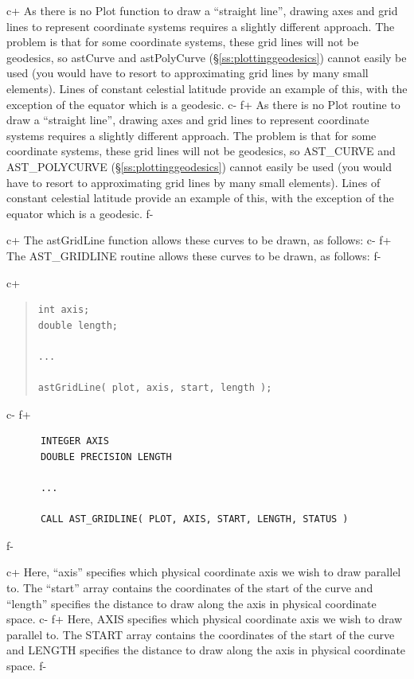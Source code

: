 \documentclass[twoside,11pt]{article}
\newcommand{\secref}[1]{\S\ref{#1}}
\newcommand{\secref}[1]{\ref{#1}}
\begin{document}
c+
As there is no Plot function to draw a ``straight line'', drawing axes
and grid lines to represent coordinate systems requires a slightly
different approach. The problem is that for some coordinate systems,
these grid lines will not be geodesics, so astCurve and astPolyCurve
(\secref{ss:plottinggeodesics}) cannot easily be used (you would have
to resort to approximating grid lines by many small elements). Lines
of constant celestial latitude provide an example of this, with the
exception of the equator which is a geodesic.
c-
f+
As there is no Plot routine to draw a ``straight line'', drawing axes
and grid lines to represent coordinate systems requires a slightly
different approach. The problem is that for some coordinate systems,
these grid lines will not be geodesics, so AST\_CURVE and
AST\_POLYCURVE (\secref{ss:plottinggeodesics}) cannot easily be used
(you would have to resort to approximating grid lines by many small
elements). Lines of constant celestial latitude provide an example of
this, with the exception of the equator which is a geodesic.
f-

c+
The astGridLine function allows these curves to be drawn, as follows:
c-
f+
The AST\_GRIDLINE routine allows these curves to be drawn, as follows:
f-

c+
\begin{quote}
\small
\begin{verbatim}
int axis;
double length;

...

astGridLine( plot, axis, start, length );
\end{verbatim}
\normalsize
\end{quote}
c-
f+
\small
\begin{verbatim}
      INTEGER AXIS
      DOUBLE PRECISION LENGTH

      ...

      CALL AST_GRIDLINE( PLOT, AXIS, START, LENGTH, STATUS )
\end{verbatim}
\normalsize
f-

c+
Here, ``axis'' specifies which physical coordinate axis we wish to
draw parallel to. The ``start'' array contains the coordinates of the
start of the curve and ``length'' specifies the distance to draw along
the axis in physical coordinate space.
c-
f+
Here, AXIS specifies which physical coordinate axis we wish to draw
parallel to. The START array contains the coordinates of the start of
the curve and LENGTH specifies the distance to draw along the axis in
physical coordinate space.
f-
\end{document}
